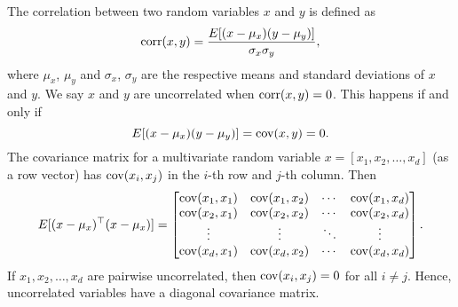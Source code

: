 The correlation between two random variables \(x\) and \(y\) is defined as
\begin{equation}
    \operatorname{corr}(x,y) = \frac{E[(x-\mu_x)(y-\mu_y)]}{\sigma_x \sigma_y},
\end{equation}
where \(\mu_x\), \(\mu_y\) and \(\sigma_x\), \(\sigma_y\) are the respective means and standard deviations of \(x\) and \(y\).
We say \(x\) and \(y\) are uncorrelated when \(\operatorname{corr}(x,y) = 0\).
This happens if and only if
\begin{equation}
    \label{eqn:covariance-formula}
    E[(x-\mu_x)(y-\mu_y)] = \operatorname{cov}(x,y) = 0.
\end{equation}
The covariance matrix for a multivariate random variable \(x = [x_1, x_2, \dots, x_d]\) (as a row vector) has \(\operatorname{cov}(x_i, x_j)\) in the \(i\)-th row and \(j\)-th column.
Then
\begin{equation}
    \label{eqn:covariance-matrix-formula}
    E[(x-\mu_x)^\top (x-\mu_x)] =
    \begin{bmatrix}
        \operatorname{cov}(x_1, x_1) & \operatorname{cov}(x_1, x_2) & \cdots & \operatorname{cov}(x_1, x_d) \\
        \operatorname{cov}(x_2, x_1) & \operatorname{cov}(x_2, x_2) & \cdots & \operatorname{cov}(x_2, x_d) \\
        \vdots         & \vdots         & \ddots & \vdots         \\
        \operatorname{cov}(x_d, x_1) & \operatorname{cov}(x_d, x_2) & \cdots & \operatorname{cov}(x_d, x_d) \\
    \end{bmatrix}.
\end{equation}
If \(x_1, x_2, \dots, x_d\) are pairwise uncorrelated, then \(\operatorname{cov}(x_i, x_j) = 0\) for all \(i \neq j\).
Hence, uncorrelated variables have a diagonal covariance matrix.

